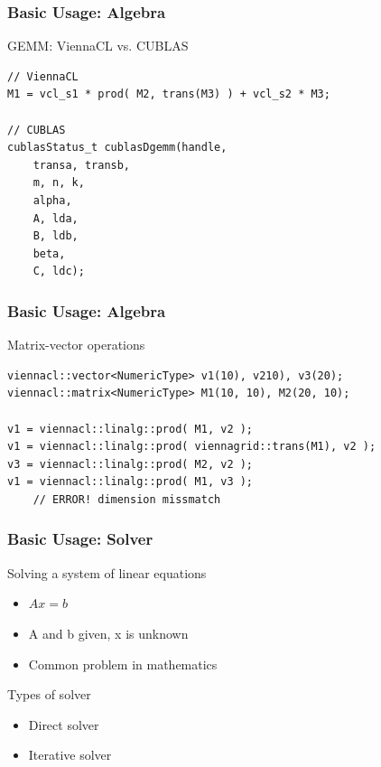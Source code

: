 \begin{frame}[fragile]
\frametitle{Basic Usage: Algebra}

\begin{block}{GEMM: ViennaCL vs. CUBLAS}
  \begin{lstlisting}
// ViennaCL
M1 = vcl_s1 * prod( M2, trans(M3) ) + vcl_s2 * M3;

// CUBLAS
cublasStatus_t cublasDgemm(handle,
    transa, transb,
    m, n, k,
    alpha,
    A, lda,
    B, ldb,
    beta,
    C, ldc);
  \end{lstlisting}
\end{block}

\end{frame}




\begin{frame}[fragile]
\frametitle{Basic Usage: Algebra}

\begin{block}{Matrix-vector operations}
  \begin{lstlisting}
viennacl::vector<NumericType> v1(10), v210), v3(20);
viennacl::matrix<NumericType> M1(10, 10), M2(20, 10);

v1 = viennacl::linalg::prod( M1, v2 );
v1 = viennacl::linalg::prod( viennagrid::trans(M1), v2 );
v3 = viennacl::linalg::prod( M2, v2 );
v1 = viennacl::linalg::prod( M1, v3 );
    // ERROR! dimension missmatch
  \end{lstlisting}
\end{block}

\end{frame}



\begin{frame}
\frametitle{Basic Usage: Solver}

\begin{block}{Solving a system of linear equations}
  \begin{itemize}
   \item $Ax=b$
   \item A and b given, x is unknown
   \item Common problem in mathematics
  \end{itemize}
\end{block}

\begin{block}{Types of solver}
  \begin{itemize}
   \item Direct solver
   \item Iterative solver
  \end{itemize}
\end{block}

\end{frame}



